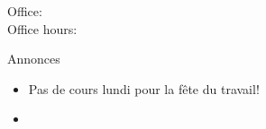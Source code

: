 \documentclass{beamer}
\subtitle[Grands nombres et adjectifs invariables]{Les grands nombres et les adjectifs invariables}
\begin{document}
  \begin{frame}
    \titlepage
    \tiny{Office: \\
          Office hours: }
  \end{frame}

  \begin{frame}{Annonces }
    \begin{itemize}
      \item Pas de cours lundi pour la fête du travail!
      \item[] 
    \end{itemize}
  \end{frame}
  
\end{document}
